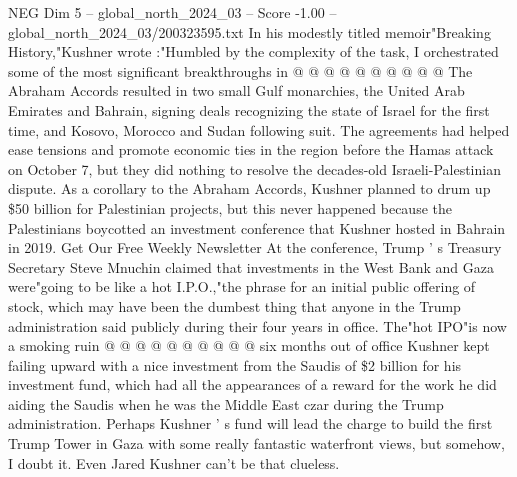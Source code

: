\begin{textsample}{NEG Dim 5 – global\_north\_2024\_03 – Score -1.00 – global\_north\_2024\_03/200323595.txt}
In his modestly titled memoir"Breaking History,"Kushner wrote :"Humbled by the complexity of the task, I orchestrated some of the most significant breakthroughs in @ @ @ @ @ @ @ @ @ @ The Abraham Accords resulted in two small Gulf monarchies, the United Arab Emirates and Bahrain, signing deals recognizing the state of Israel for the first time, and Kosovo, Morocco and Sudan following suit.
The agreements had helped ease tensions and promote economic ties in the region before the Hamas attack on October 7, but they did nothing to resolve the decades-old Israeli-Palestinian dispute.
As a corollary to the Abraham Accords, Kushner planned to drum up \$50 billion for Palestinian projects, but this never happened because the Palestinians boycotted an investment conference that Kushner hosted in Bahrain in 2019.
Get Our Free Weekly Newsletter At the conference, Trump ' s Treasury Secretary Steve Mnuchin claimed that investments in the West Bank and Gaza were"going to be like a hot I.P.O.,"the phrase for an initial public offering of stock, which may have been the dumbest thing that anyone in the Trump administration said publicly during their four years in office.
The"hot IPO"is now a smoking ruin @ @ @ @ @ @ @ @ @ @ six months out of office Kushner kept failing upward with a nice investment from the Saudis of \$2 billion for his investment fund, which had all the appearances of a reward for the work he did aiding the Saudis when he was the Middle East czar during the Trump administration.
Perhaps Kushner ' s fund will lead the charge to build the first Trump Tower in Gaza with some really fantastic waterfront views, but somehow, I doubt it.
Even Jared Kushner can't be that clueless.

\end{textsample}
